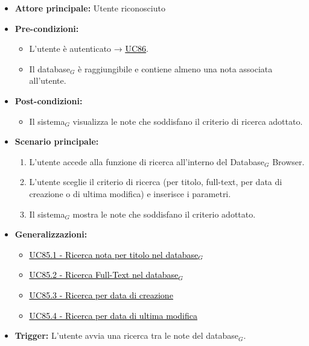 \documentclass[a4paper, 10pt]{article}
\newcommand{\uclink}[2]{\hyperlink{#1}{\textcolor{black}{\underline{#2}}}}
\begin{document}
\begin{itemize}
    \item \textbf{Attore principale:} Utente riconosciuto
    \item \textbf{Pre-condizioni:}
        \begin{itemize}
            \item L'utente è autenticato → \uclink{uc:86}{UC86}.
            \item Il database$_G$ è raggiungibile e contiene almeno una nota associata all'utente.
        \end{itemize}
    \item \textbf{Post-condizioni:}
        \begin{itemize}
            \item Il sistema$_G$ visualizza le note che soddisfano il criterio di ricerca adottato.
        \end{itemize}
    \item \textbf{Scenario principale:}
        \begin{enumerate}
            \item L'utente accede alla funzione di ricerca all'interno del Database$_G$ Browser.
            \item L'utente sceglie il criterio di ricerca (per titolo, full-text, per data di creazione o di ultima modifica) e inserisce i parametri.
            \item Il sistema$_G$ mostra le note che soddisfano il criterio adottato.
        \end{enumerate}
    \item \textbf{Generalizzazioni:}
        \begin{itemize}
            \item \uclink{uc:85.1}{UC85.1 - Ricerca nota per titolo nel database$_G$}
            \item \uclink{uc:85.2}{UC85.2 - Ricerca Full-Text nel database$_G$}
            \item \uclink{uc:85.3}{UC85.3 - Ricerca per data di creazione}
            \item \uclink{uc:85.4}{UC85.4 - Ricerca per data di ultima modifica}
        \end{itemize}
    \item \textbf{Trigger:} L'utente avvia una ricerca tra le note del database$_G$.
\end{itemize}
\end{document}
